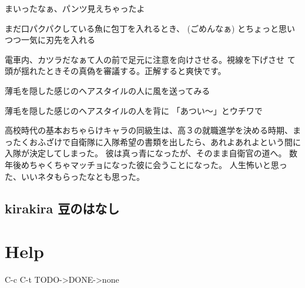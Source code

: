 \documentclass[11pt]{article}
\begin{document}
まいったなぁ、パンツ見えちゃったよ

 まだ口パクパクしている魚に包丁を入れるとき、
(ごめんなぁ) とちょっと思いつつ一気に刃先を入れる

 電車内、カツラだなぁて人の前で足元に注意を向けさせる。視線を下げさせ
 て頭が揺れたときその真偽を審議する。正解すると爽快です。

 薄毛を隠した感じのヘアスタイルの人に風を送ってみる

 薄毛を隠した感じのヘアスタイルの人を背に 「あつい〜」とウチワで

 
高校時代の基本おちゃらけキャラの同級生は、高３の就職進学を決める時期、まったくおふざけで自衛隊に入隊希望の書類を出したら、あれよあれよという間に入隊が決定してしまった。
彼は真っ青になったが、そのまま自衛官の道へ。
数年後めちゃくちゃマッチョになった彼に会うことになった。
人生怖いと思った、いいネタもらったなとも思った。
\subsection{kirakira 豆のはなし}
\label{sec-130_2}
\section{Help}
\label{sec-131}

C-c C-t TODO->DONE->none
\end{document}

